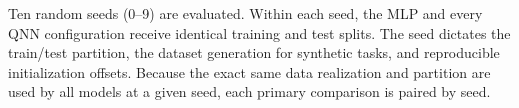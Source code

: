 Ten random seeds (0--9) are evaluated. Within each seed, the MLP and every QNN configuration receive identical training and test splits. The seed dictates the train/test partition, the dataset generation for synthetic tasks, and reproducible initialization offsets. Because the exact same data realization and partition are used by all models at a given seed, each primary comparison is paired by seed.
